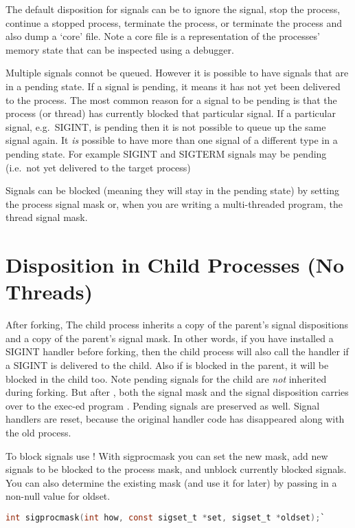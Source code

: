 The default disposition for signals can be to ignore the signal, stop the process, continue a stopped process, terminate the process, or terminate the process and also dump a `core' file. Note a core file is a representation of the processes' memory state that can be inspected using a debugger.

Multiple signals connot be queued. However it is possible to have signals that are in a pending state. If a signal is pending, it means it has not yet been delivered to the process. The most common reason for a signal to be pending is that the process (or thread) has currently blocked that particular signal. If a particular signal, e.g.~SIGINT, is pending then it is not possible to queue up the same signal again. It \emph{is} possible to have more than one signal of a different type in a pending state. For example SIGINT and SIGTERM signals may be pending (i.e.~not yet delivered to the target process)

Signals can be blocked (meaning they will stay in the pending state) by setting the process signal mask or, when you are writing a multi-threaded program, the thread signal mask.

\section{Disposition in Child Processes (No Threads)}

After forking, The child process inherits a copy of the parent's signal dispositions and a copy of the parent's signal mask. In other words, if you have installed a SIGINT handler before forking, then the child process will also call the handler if a SIGINT is delivered to the child. Also if  is blocked in the parent, it will be blocked in the child too. Note pending signals for the child are \emph{not} inherited during forking. But after , both the signal mask and the signal disposition carries over to the exec-ed program \cite{execute}. Pending signals are preserved as well. Signal handlers are reset, because the original handler code has disappeared along with the old process.

To block signals use ! With sigprocmask you can set the new mask, add new signals to be blocked to the process mask, and unblock currently blocked signals. You can also determine the existing mask (and use it for later) by passing in a non-null value for oldset.

\begin{lstlisting}[language=C]
int sigprocmask(int how, const sigset_t *set, sigset_t *oldset);`
\end{lstlisting}

